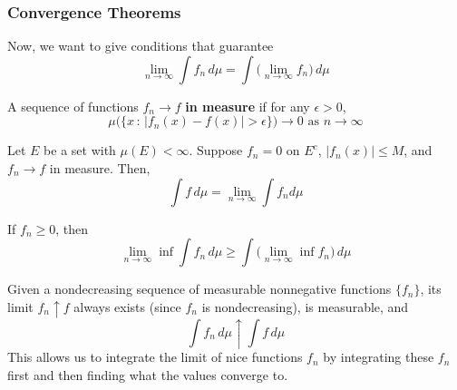 \documentclass{article}
\begin{document}
    \subsubsection{Convergence Theorems}

      Now, we want to give conditions that guarantee 
      \begin{equation}
        \lim_{n \rightarrow \infty} \int f_n \,d \mu = \int \big( \lim_{n \rightarrow \infty} f_n \big) \, d\mu
      \end{equation}

      \begin{definition}
        A sequence of functions $f_n \rightarrow f$ \textbf{in measure} if for any $\epsilon > 0$, 
        \begin{equation}
          \mu\big( \{x \,:\, |f_n (x) - f(x)| > \epsilon \}\big) \rightarrow 0 \text{ as } n \rightarrow \infty
        \end{equation}
      \end{definition}

      \begin{theorem}
        Let $E$ be a set with $\mu(E) < \infty$. Suppose $f_n = 0$ on $E^c$, $|f_n (x)| \leq M$, and $f_n \rightarrow f$ in measure. Then, 
        \begin{equation}
          \int f \,d\mu = \lim_{n \rightarrow \infty} \int f_n d\mu
        \end{equation}
      \end{theorem}

      \begin{lemma}
        If $f_n \geq 0$, then
        \begin{equation}
          \lim_{n \rightarrow \infty} \inf \int f_n \,d\mu \geq \int \Big( \lim_{n \rightarrow \infty} \inf f_n \Big) \,d\mu
        \end{equation}
      \end{lemma}

      \begin{theorem}
        Given a nondecreasing sequence of measurable nonnegative functions $\{f_n\}$, its limit $f_n \uparrow f$ always exists (since $f_n$ is nondecreasing), is measurable, and 
        \begin{equation}
          \int f_n \, d\mu \uparrow \int f \, d\mu
        \end{equation}
        This allows us to integrate the limit of nice functions $f_n$ by integrating these $f_n$ first and then finding what the values converge to. 
      \end{theorem}
\end{document}
